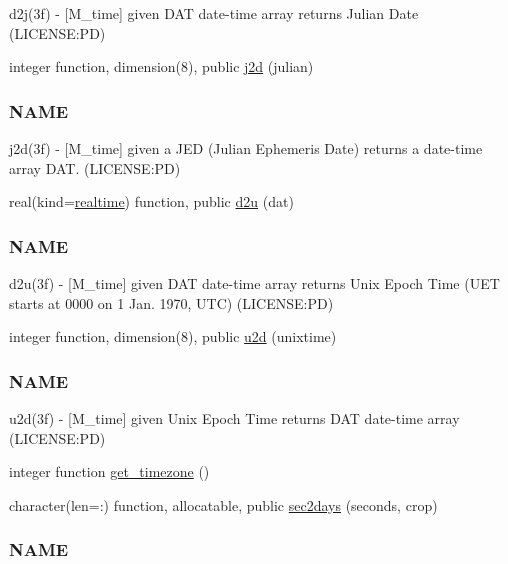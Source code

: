 \begin{DoxyCompactItemize}
\begin{DoxyCompactList}
d2j(3f) -\/ \mbox{[}M\+\_\+time\mbox{]} given D\+AT date-\/time array returns Julian Date (L\+I\+C\+E\+N\+SE\+:PD) \end{DoxyCompactList}\item 
integer function, dimension(8), public \mbox{\hyperlink{namespacem__time_a3ad5cad6df02c53e0429c3602a072e3c}{j2d}} (julian)
\begin{DoxyCompactList}\small\item\em \subsubsection*{N\+A\+ME}

j2d(3f) -\/ \mbox{[}M\+\_\+time\mbox{]} given a J\+ED (Julian Ephemeris Date) returns a date-\/time array D\+AT. (L\+I\+C\+E\+N\+SE\+:PD) \end{DoxyCompactList}\item 
real(kind=\mbox{\hyperlink{namespacem__time_ac10ea9e8d59ec74eaa7d89f2517d7422}{realtime}}) function, public \mbox{\hyperlink{namespacem__time_a1506e2889a156387df4481ed0534be81}{d2u}} (dat)
\begin{DoxyCompactList}\small\item\em \subsubsection*{N\+A\+ME}

d2u(3f) -\/ \mbox{[}M\+\_\+time\mbox{]} given D\+AT date-\/time array returns Unix Epoch Time (U\+ET starts at 0000 on 1 Jan. 1970, U\+TC) (L\+I\+C\+E\+N\+SE\+:PD) \end{DoxyCompactList}\item 
integer function, dimension(8), public \mbox{\hyperlink{namespacem__time_a083bc231f8ba1879d7f86ab424e77d6c}{u2d}} (unixtime)
\begin{DoxyCompactList}\small\item\em \subsubsection*{N\+A\+ME}

u2d(3f) -\/ \mbox{[}M\+\_\+time\mbox{]} given Unix Epoch Time returns D\+AT date-\/time array (L\+I\+C\+E\+N\+SE\+:PD) \end{DoxyCompactList}\item 
integer function \mbox{\hyperlink{namespacem__time_a7903410a1d28bcdf3d33ab0c2d74b124}{get\+\_\+timezone}} ()
\item 
character(len=\+:) function, allocatable, public \mbox{\hyperlink{namespacem__time_a7788285d79b8d58323b05e9a30a2d992}{sec2days}} (seconds, crop)
\begin{DoxyCompactList}\small\item\em \subsubsection*{N\+A\+ME}


\end{DoxyCompactList}
\end{DoxyCompactItemize}
